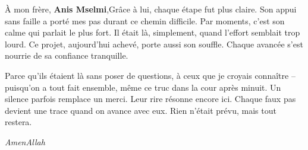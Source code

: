 À mon frère, \textbf{Anis Mselmi},Grâce à lui, chaque étape fut plus claire. Son appui sans faille a porté mes pas durant ce chemin difficile. Par moments, c’est son calme qui parlait le plus fort. Il était là, simplement, quand l’effort semblait trop lourd. Ce projet, aujourd’hui achevé, porte aussi son souffle. Chaque avancée s’est nourrie de sa confiance tranquille.

\vspace{0.2cm}

Parce qu’ils étaient là sans poser de questions, à ceux que je croyais connaître – puisqu’on a tout fait ensemble, même ce truc dans la cour après minuit. Un silence parfois remplace un merci. Leur rire résonne encore ici. Chaque faux pas devient une trace quand on avance avec eux. Rien n’était prévu, mais tout restera.

\vspace{0.5cm} %

\hfill{\itshape AmenAllah}


